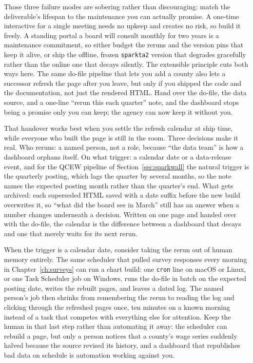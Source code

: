 Those three failure modes are sobering rather than discouraging: match the deliverable's lifespan to the maintenance you can actually promise. A one-time interactive for a single meeting needs no upkeep and creates no risk, so build it freely. A standing portal a board will consult monthly for two years is a maintenance commitment, so either budget the reruns and the version pins that keep it alive, or ship the offline, frozen \texttt{sparkta2} version that degrades gracefully rather than the online one that decays silently. The extensible principle cuts both ways here. The same do-file pipeline that lets you add a county also lets a successor refresh the page after you leave, but only if you shipped the code and the documentation, not just the rendered HTML. Hand over the do-file, the data source, and a one-line \enquote{rerun this each quarter} note, and the dashboard stops being a promise only you can keep; the agency can now keep it without you.

That handover works best when you settle the refresh calendar at ship time, while everyone who built the page is still in the room. Three decisions make it real. Who reruns: a named person, not a role, because \enquote{the data team} is how a dashboard orphans itself. On what trigger: a calendar date or a data-release event, and for the QCEW pipeline of Section~\ref{sec:sparkwall} the natural trigger is the quarterly posting, which lags the quarter by several months, so the note names the expected posting month rather than the quarter's end. What gets archived: each superseded HTML saved with a date suffix before the new build overwrites it, so \enquote{what did the board see in March} still has an answer when a number changes underneath a decision. Written on one page and handed over with the do-file, the calendar is the difference between a dashboard that decays and one that merely waits for its next rerun.

When the trigger is a calendar date, consider taking the rerun out of human memory entirely. The same scheduler that pulled survey responses every morning in Chapter~\ref{ch:surveys} can run a chart build: one \texttt{cron} line on macOS or Linux, or one Task Scheduler job on Windows, runs the do-file in batch on the expected posting date, writes the rebuilt pages, and leaves a dated log. The named person's job then shrinks from remembering the rerun to reading the log and clicking through the refreshed pages once, ten minutes on a known morning instead of a task that competes with everything else for attention. Keep the human in that last step rather than automating it away: the scheduler can rebuild a page, but only a person notices that a county's wage series suddenly halved because the source revised its history, and a dashboard that republishes bad data on schedule is automation working against you.

